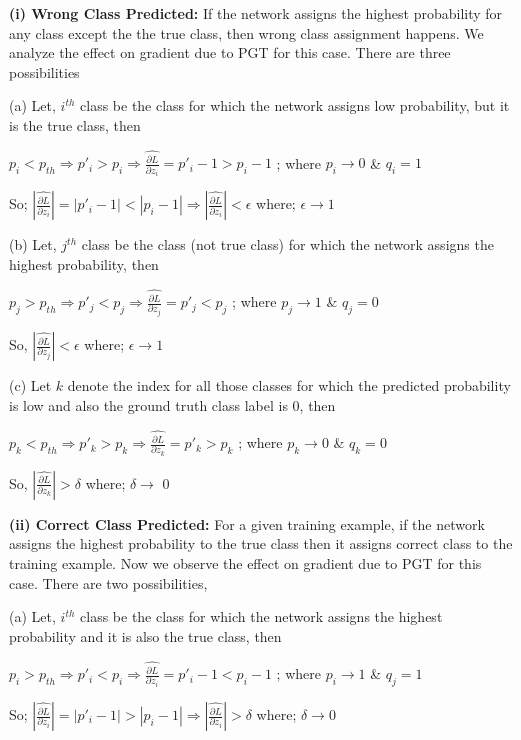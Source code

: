 \documentclass[runningheads]{llncs}
\begin{document}
\textbf{(i) Wrong Class Predicted:}
If the network assigns the highest probability for any class except the the true class,
then wrong class assignment happens. We analyze the effect on gradient due to PGT for
this case. There are three possibilities

(a) Let, $i^{th}$ class be the class for which the network assigns low probability, but
it is the true class, then

$p_i < p_{th} \Rightarrow p'_i > p_i \Rightarrow \widehat{\frac{\partial L}{\partial
z_i}} = p'_i -1 >  p_i -1 $ ; where $p_i\rightarrow 0$ \& $q_i = 1$

So; $|\widehat{\frac{\partial L}{\partial z_i}}| = |p'_i -1| <  |p_i -1| \Rightarrow
|\widehat{\frac{\partial L}{\partial z_i}}| <\epsilon $ where; $\epsilon\rightarrow 1$

(b) Let, $j^{th}$ class be the class (not true class) for which the network assigns the
highest probability, then

$p_j > p_{th} \Rightarrow p'_j < p_j \Rightarrow \widehat{\frac{\partial L}{\partial
z_j}} = p'_j <  p_j$ ; where $p_j\rightarrow 1$ \& $q_j = 0$

So, $|\widehat{\frac{\partial L}{\partial z_j}}| <\epsilon$ where; $\epsilon\rightarrow
1$



(c) Let $k$ denote the index for all those classes for which the predicted probability
is low and also the ground truth class label is $0$, then

$p_k < p_{th} \Rightarrow p'_k > p_k \Rightarrow \widehat{\frac{\partial L}{\partial
z_k}} = p'_k >  p_k$ ; where $p_k\rightarrow 0$ \& $q_k = 0$

So, $|\widehat{\frac{\partial L}{\partial z_k}}| >\delta$ where; $\delta\rightarrow$ 0

\textbf{(ii) Correct Class Predicted:}
For a given training example, if the network assigns the highest probability to the true
class then it assigns correct class to the training example. Now we observe the effect
on gradient due to PGT for this case. There are two possibilities,

(a) Let, $i^{th}$ class be the class for which the network assigns the highest
probability and it is also the true class, then

$p_i > p_{th} \Rightarrow p'_i < p_i \Rightarrow \widehat{\frac{\partial L}{\partial
z_i}} = p'_i -1 <  p_i -1 $ ; where $p_i\rightarrow 1$ \& $q_j = 1$

So; $|\widehat{\frac{\partial L}{\partial z_i}}| = |p'_i -1| >  |p_i -1|  \Rightarrow
|\widehat{\frac{\partial L}{\partial z_i}}| >\delta $ where; $\delta\rightarrow 0$
\end{document}
